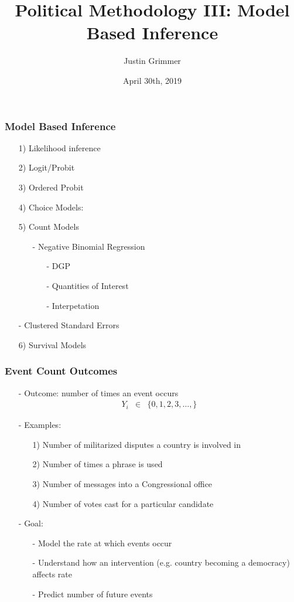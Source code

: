 \documentclass{beamer}
\title[Methodology III] %
{Political Methodology III: Model Based Inference}
\author{Justin Grimmer}
\institute[Stanford University]{Professor\\Department of Political Science \\  Stanford University}
\date{April 30th, 2019}
\begin{document}
\begin{frame}
\titlepage
\end{frame}


\begin{frame}
\frametitle{Model Based Inference}

\begin{itemize}
\item[1)] Likelihood inference
\item[2)] Logit/Probit
\item[3)] Ordered Probit
\item[4)] Choice Models:
\item[5)] Count Models
\begin{itemize}
\item[-] Negative Binomial Regression
\begin{itemize}
\item[-] DGP
\item[-] Quantities of Interest
\item[-] Interpetation
\end{itemize}
\end{itemize}
\item[-] Clustered Standard Errors
\item[6)] Survival Models
\end{itemize}

\end{frame}


\begin{frame}
\frametitle{Event Count Outcomes}

\begin{itemize}
\item[-] Outcome: number of times an event occurs
\begin{eqnarray}
Y_{i} & \in & \{0, 1, 2, 3, \hdots, \} \nonumber
\end{eqnarray}
\item[-] Examples:
\begin{itemize}
\item[1)] Number of militarized disputes a country is involved in
\item[2)] Number of times a phrase is used
\item[3)] Number of messages into a Congressional office
\item[4)] Number of votes cast for a particular candidate
\end{itemize}
\item[-] Goal:
\begin{itemize}
\item[-] Model the \alert{rate} at which events occur
\item[-] Understand how an intervention (e.g. country becoming a democracy) affects rate
\item[-] Predict number of future events
\end{itemize}
\end{itemize}

\end{frame}
\end{document}
